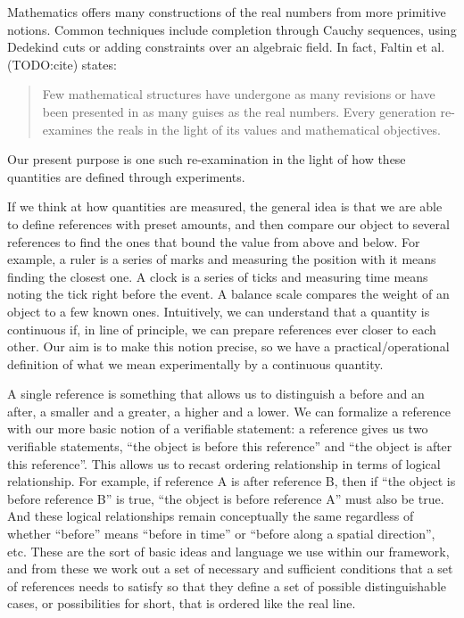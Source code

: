 \documentclass[12pt]{iopart}
\begin{document}
Mathematics offers many constructions of the real numbers from more primitive notions. Common techniques include completion through Cauchy sequences, using Dedekind cuts or adding constraints over an algebraic field. In fact, Faltin et al. (TODO:cite) states:
\begin{quote}
Few mathematical structures have undergone as many revisions or have been presented in as many guises as the real numbers. Every generation re-examines the reals in the light of its values and mathematical objectives.
\end{quote}
Our present purpose is one such re-examination in the light of how these quantities are defined through experiments.

If we think at how quantities are measured, the general idea is that we are able to define references with preset amounts, and then compare our object to several references to find the ones that bound the value from above and below. For example, a ruler is a series of marks and measuring the position with it means finding the closest one. A clock is a series of ticks and measuring time means noting the tick right before the event. A balance scale compares the weight of an object to a few known ones. Intuitively, we can understand that a quantity is continuous if, in line of principle, we can prepare references ever closer to each other. Our aim is to make this notion precise, so we have a practical/operational definition of what we mean experimentally by a continuous quantity.

A single reference is something that allows us to distinguish a before and an after, a smaller and a greater, a higher and a lower. We can formalize a reference with our more basic notion of a verifiable statement: a reference gives us two verifiable statements, ``the object is before this reference'' and ``the object is after this reference''. This allows us to recast ordering relationship in terms of logical relationship. For example, if reference A is after reference B, then if ``the object is before reference B'' is true, ``the object is before reference A'' must also be true. And these logical relationships remain conceptually the same regardless of whether ``before'' means ``before in time'' or ``before along a spatial direction'', etc. These are the sort of basic ideas and language we use within our framework, and from these we work out a set of necessary and sufficient conditions that a set of references needs to satisfy so that they define a set of possible distinguishable cases, or possibilities for short, that is ordered like the real line.
\end{document}
